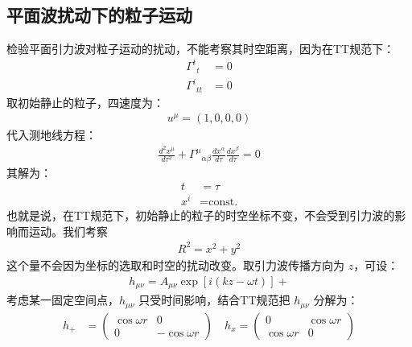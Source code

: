 \subsection{平面波扰动下的粒子运动}
检验平面引力波对粒子运动的扰动，不能考察其时空距离，因为在TT规范下：
\begin{align}
  \Gamma^{t}{}_{t} &= 0 \\
  \Gamma^{i}{}_{tt} &= 0
\end{align}
取初始静止的粒子，四速度为：
\begin{align}
  u^{\mu} = (1,0,0,0)
\end{align}
代入测地线方程：
\begin{align}
  \frac{d^2 x^{\mu}}{d\tau^2} + \Gamma^{\mu}{}_{\alpha\beta} \frac{dx^{\alpha}}{d\tau} \frac{dx^{\beta}}{d\tau} = 0
\end{align}
其解为：
\begin{align}
  t &= \tau \\
  x^i &= \text{const.}
\end{align}
也就是说，在TT规范下，初始静止的粒子的时空坐标不变，不会受到引力波的影响而运动。我们考察
\begin{align}
  R^2 = x^2 + y^2
\end{align}
这个量不会因为坐标的选取和时空的扰动改变。取引力波传播方向为 $z$，可设：
\begin{align}
  h_{\mu\nu} = A_{\mu\nu}\exp[i(kz - \omega t)] +
\end{align}
考虑某一固定空间点，$h_{\mu\nu}$ 只受时间影响，结合TT规范把 $h_{\mu\nu}$ 分解为：
\begin{align}
  h_{+} &= \begin{pmatrix}
    \cos{\omega r} & 0 \\
    0 & -\cos{\omega r}
  \end{pmatrix}
  \quad
  h_{x} = \begin{pmatrix}
    0 & \cos{\omega r} \\
    \cos{\omega r} & 0
  \end{pmatrix}
\end{align}

